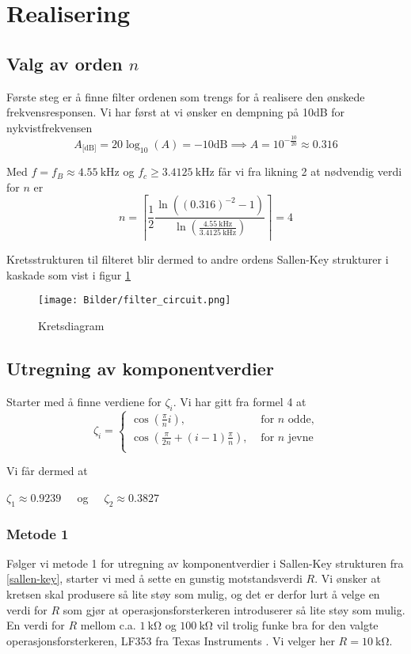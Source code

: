 \section{Realisering}
\label{realisering}
\subsection{Valg av orden $n$}
Første steg er å finne filter ordenen som trengs for å realisere den ønskede frekvensresponsen. Vi har først at vi 
ønsker en dempning på 10dB for nykvistfrekvensen
\[
    A_{\text{[dB]}} = 20 \log_{10}(A) = -10\text{dB} \implies A = 10^{-\frac{10}{20}} \approx 0.316
\]

Med $f = f_B \approx \SI{4.55}{\kilo\hertz}$ og $f_c \geq \SI{3.4125}{\kilo\hertz}$ får vi fra likning 2 at nødvendig 
verdi for $n$ er
\[
    n = \left\lceil\frac{1}{2}\frac{\ln{\left((0.316)^{-2} - 1\right)}}{\ln{\left(\frac{\SI{4.55}{\kilo\hertz}}{\SI{3.4125}{\kilo\hertz}}\right)}}\right\rceil = 4
\]

Kretsstrukturen til filteret blir dermed to andre ordens Sallen-Key strukturer i kaskade som vist i figur \ref{fig:filter-circuit}
\begin{figure}[H]
    \centering
    \texttt{[image: Bilder/filter\_circuit.png]}
    \caption{Kretsdiagram}
    \label{fig:filter-circuit}
\end{figure}

\subsection{Utregning av komponentverdier}
Starter med å finne verdiene for $\zeta_i$. Vi har gitt fra formel 4 at
\[
    \zeta_i = \begin{cases}
        \cos\left(\frac{\pi}{n}i\right), & \text{ for $n$ odde,} \\
        \cos\left(\frac{\pi}{2n} + (i - 1)\frac{\pi}{n}\right), & \text{ for $n$ jevne} \\
    \end{cases}
\]

Vi får dermed at
\begin{center}

    $\zeta_1 \approx 0.9239\:\:\:\:\:$ og $\:\:\:\:\:\zeta_2 \approx 0.3827$
\end{center}

\subsubsection{Metode 1}
Følger vi metode 1 for utregning av komponentverdier i Sallen-Key strukturen fra \ref{sallen-key}, starter vi
med å sette en gunstig motstandsverdi $R$. Vi ønsker at kretsen skal produsere så lite støy som mulig,
og det er derfor lurt å velge en verdi for $R$ som gjør at operasjonsforsterkeren introduserer så lite støy
som mulig. En verdi for $R$ mellom c.a. $\SI{1}{\kilo\ohm}$ og $\SI{100}{\kilo\ohm}$ vil trolig funke bra 
for den valgte operasjonsforsterkeren, LF353 fra Texas Instruments \cite{opamp}.
Vi velger her $R = \SI{10}{\kilo\ohm}$.

